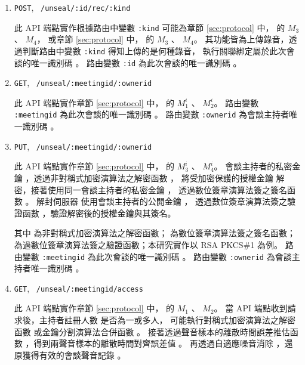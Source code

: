\begin{enumerate}
    \item \texttt{POST},~ \texttt{/unseal/:id/rec/:kind}

        此 API 端點實作根據路由中變數 \texttt{:kind} 可能為章節 \ref{sec:protocol} 中，
     的 $M_{3}$ 、 $M_{4}$，
    或章節 \ref{sec:protocol} 中，
     的 $M_{3}$ 、 $M_{4}$。
    其功能皆為上傳錄音，透過判斷路由中變數 \texttt{:kind} 得知上傳的是何種錄音，
    執行關聯綁定屬於此次會談的唯一識別碼 \DEFsessionID。
    路由變數 \texttt{:id} 為此次會談的唯一識別碼 \DEFsessionID。

    \item \texttt{GET},~ \texttt{/unseal/:meetingid/:ownerid}

        此 API 端點實作章節 \ref{sec:protocol} 中，
     的 $M_{1}^{i}$ 、 $M_{2}^{i}$。
    路由變數 \texttt{:meetingid} 為此次會談的唯一識別碼 \DEFsessionID。
    路由變數 \texttt{:ownerid} 為會談主持者唯一識別碼 \DEFownerID。

    \item \texttt{PUT},~ \texttt{/unseal/:meetingid/:ownerid}

        此 API 端點實作章節 \ref{sec:protocol} 中，
     的 $M_{3}^{i}$ 、 $M_{4}^{i}$。
    會談主持者的私密金鑰 \DEFprivateKey，透過非對稱式加密演算法之解密函數 \DEFfuncDecSK{}，
    將受加密保護的授權金鑰 \DEFakEnc 解密，接著使用同一會談主持者的私密金鑰 \DEFprivateKey，
    透過數位簽章演算法簽之簽名函數 \DEFfuncSignSK{}。
    解封伺服器 \DEFserver 使用會談主持者的公開金鑰 \DEFpublicKey，
    透過數位簽章演算法簽之驗證函數 \DEFfuncVerfPK{}，驗證解密後的授權金鑰與其簽名。

        其中 \DEFfuncDecSK{} 為非對稱式加密演算法之解密函數；\DEFfuncSignSK{} 為數位簽章演算法簽之簽名函數；
    \DEFfuncVerfPK{} 為過數位簽章演算法簽之驗證函數；本研究實作以 RSA PKCS\#1 \cite{rfc8017} 為例。
    路由變數 \texttt{:meetingid} 為此次會談的唯一識別碼 \DEFsessionID。
    路由變數 \texttt{:ownerid} 為會談主持者唯一識別碼 \DEFownerID。

    \item \texttt{GET},~ \texttt{/unseal/:meetingid/access}

        此 API 端點實作章節 \ref{sec:protocol} 中，
     的 $M_{1}$ 、 $M_{2}$。
    當 API 端點收到請求後，主持者註冊人數 \DEFowreg 是否為一或多人，
    可能執行對稱式加密演算法之解密函數 \DEFfuncDecEK{} 或金鑰分割演算法合併函數 \DEFfuncSSC{}。
    接著透過聲音樣本的離散時間誤差推估函數 \DEFfuncEstm{}，得到兩聲音樣本的離散時間對齊誤差值 \DEFshift。
    再透過自適應噪音消除 \DEFfuncAnc{}，還原獲得有效的會談聲音記錄 \DEFrecREV。


\end{enumerate}
